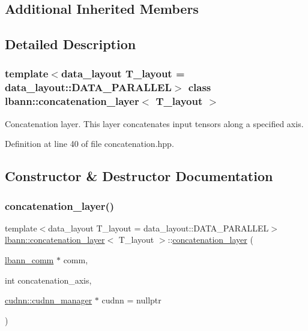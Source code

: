 \subsection*{Additional Inherited Members}


\subsection{Detailed Description}
\subsubsection*{template$<$data\+\_\+layout T\+\_\+layout = data\+\_\+layout\+::\+D\+A\+T\+A\+\_\+\+P\+A\+R\+A\+L\+L\+EL$>$\newline
class lbann\+::concatenation\+\_\+layer$<$ T\+\_\+layout $>$}

Concatenation layer. This layer concatenates input tensors along a specified axis. 

Definition at line 40 of file concatenation.\+hpp.



\subsection{Constructor \& Destructor Documentation}
\mbox{\label{classlbann_1_1concatenation__layer_ab826328d5224933dfc90e246d16de50e}} 
\subsubsection{\texorpdfstring{concatenation\+\_\+layer()}{concatenation\_layer()}\hspace{0.1cm}{\footnotesize\ttfamily [1/2]}}
{\footnotesize\ttfamily template$<$data\+\_\+layout T\+\_\+layout = data\+\_\+layout\+::\+D\+A\+T\+A\+\_\+\+P\+A\+R\+A\+L\+L\+EL$>$ \\
\hyperlink{classlbann_1_1concatenation__layer}{lbann\+::concatenation\+\_\+layer}$<$ T\+\_\+layout $>$\+::\hyperlink{classlbann_1_1concatenation__layer}{concatenation\+\_\+layer} (\begin{DoxyParamCaption}\item[{\hyperlink{classlbann_1_1lbann__comm}{lbann\+\_\+comm} $\ast$}]{comm,  }\item[{int}]{concatenation\+\_\+axis,  }\item[{\hyperlink{classlbann_1_1cudnn_1_1cudnn__manager}{cudnn\+::cudnn\+\_\+manager} $\ast$}]{cudnn = {\ttfamily nullptr} }\end{DoxyParamCaption})\hspace{0.3cm}{\ttfamily [inline]}}



